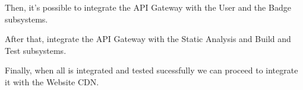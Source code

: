 \begin{adjustbox}{
        max size={\textwidth}{},
        center,
        caption={API Gateway subsystem step 1},
        label={fig:API Gateway subsystem step 1},
        figure=H}
\end{adjustbox}

Then, it's possible to integrate the API Gateway with the User and the Badge subsystems.


\begin{adjustbox}{
        max size={\textwidth}{},
        center,
        caption={API Gateway subsystem step 2},
        label={fig:API Gateway subsystem step 2},
        figure=H}
\end{adjustbox}

After that, integrate the API Gateway with the Static Analysis and Build and Test subsystems.

\begin{adjustbox}{
        max size={\textwidth}{},
        center,
        caption={API Gateway subsystem step 3},
        label={fig:API Gateway subsystem step 3},
        figure=H}
\end{adjustbox}

Finally, when all is integrated and tested sucessfully we can proceed to integrate it with the Website CDN.

\begin{adjustbox}{
        max size={\textwidth}{},
        center,
        caption={API Gateway subsystem step 4},
        label={fig:API Gateway subsystem step 4},
        figure=H}
\end{adjustbox}